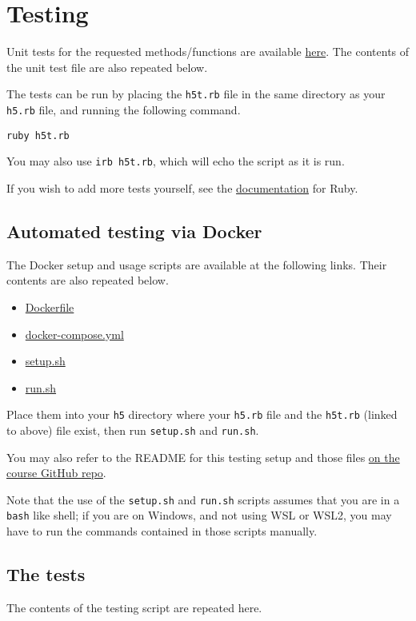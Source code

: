 \documentclass[11pt]{article}
\begin{document}
\section*{Testing}
\label{sec:orgcbccb24}
Unit tests for the requested methods/functions
are available \href{./testing/h5/h5t.rb}{here}.
The contents of the unit test file are also repeated below.

The tests can be run by placing the \texttt{h5t.rb} file
in the same directory as your \texttt{h5.rb} file, and
running the following command.
\begin{verbatim}
ruby h5t.rb
\end{verbatim}
You may also use \texttt{irb h5t.rb}, which will echo the script
as it is run.

If you wish to add more tests yourself,
see the \href{https://en.wikibooks.org/wiki/Ruby\_Programming/Unit\_testing}{documentation}
for Ruby.

\subsection*{Automated testing via Docker}
\label{sec:org66861ed}
The Docker setup and usage scripts are available at the following links.
Their contents are also repeated below.
\begin{itemize}
\item \href{./testing/h5/Dockerfile}{Dockerfile}
\item \href{./testing/h5/docker-compose.yml}{docker-compose.yml}
\item \href{./testing/h5/setup.sh}{setup.sh}
\item \href{./testing/h5/run.sh}{run.sh}
\end{itemize}
Place them into your \texttt{h5} directory where your \texttt{h5.rb} file
and the \texttt{h5t.rb} (linked to above) file exist,
then run \texttt{setup.sh} and \texttt{run.sh}.

You may also refer to the README
for this testing setup and those files
\href{https://github.com/armkeh/principles-of-programming-languages/tree/master/homework/testing/h5}{on the course GitHub repo}.

Note that the use of the \texttt{setup.sh} and \texttt{run.sh} scripts assumes
that you are in a \texttt{bash} like shell; if you are on Windows,
and not using WSL or WSL2, you may have
to run the commands contained in those scripts manually.

\subsection*{The tests}
\label{sec:org0ea0da7}
The contents of the testing script are repeated here.
\end{document}
